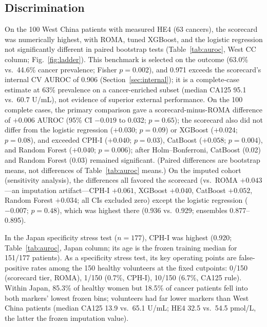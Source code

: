 \documentclass[conference]{IEEEtran}
\begin{document}
\subsection{Discrimination}\label{sec:discrimination}

On the 100 West China patients with measured HE4 (63 cancers), the
scorecard was numerically highest, with ROMA, tuned XGBoost, and the
logistic regression not significantly different in paired bootstrap
tests
(Table~\ref{tab:auroc}, West CC column; Fig.~\ref{fig:ladder}).
This benchmark is selected on the outcome (63.0\% vs.\ 44.6\%
cancer prevalence; Fisher
$p=0.002$), and 0.971 exceeds the scorecard's internal CV AUROC of
0.906 (Section~\ref{sec:internal}); it is a complete-case estimate
at 63\% prevalence on a cancer-enriched subset
(median CA125 95.1 vs.\ 60.7 U/mL), not evidence of superior
external performance.
On the 100 complete cases, the primary
comparison gave a scorecard-minus-ROMA difference of $+0.006$ AUROC
(95\% CI $-0.019$ to 0.032; $p=0.65$); the scorecard also did not
differ from the logistic regression ($+0.030$; $p=0.09$) or XGBoost
($+0.024$; $p=0.08$), and exceeded CPH-I ($+0.040$; $p=0.03$),
CatBoost ($+0.058$; $p=0.004$), and Random Forest ($+0.040$;
$p=0.006$); after Holm--Bonferroni, CatBoost (0.02) and
Random Forest (0.03) remained significant. (Paired differences are
bootstrap means, not differences of Table~\ref{tab:auroc} means.)
On the imputed cohort
(sensitivity analysis), the differences
all favored the scorecard (vs.\ ROMA $+0.043$---an
imputation artifact---CPH-I
$+0.061$, XGBoost $+0.040$, CatBoost $+0.052$, Random Forest
$+0.034$; all CIs excluded zero) except the logistic regression
($-0.007$; $p=0.48$), which was highest there (0.936 vs.\ 0.929;
ensembles 0.877--0.895).

In the Japan specificity stress test ($n=177$), CPH-I was highest
(0.920; Table~\ref{tab:auroc}, Japan column; its age is the frozen
training median for 151/177 patients). As a specificity stress test, its key operating points are
false-positive rates among the 150 healthy volunteers at the fixed
cutpoints: 0/150 (scorecard tier, ROMA), 1/150 (0.7\%, CPH-I),
10/150 (6.7\%, CA125 rule).
Within Japan, 85.3\% of healthy women but 18.5\% of cancer
patients fell into both markers' lowest frozen bins; volunteers
had far lower markers than West China patients (median
CA125 13.9 vs.\ 65.1 U/mL; HE4 32.5 vs.\ 54.5 pmol/L, the
latter the frozen imputation value).
\end{document}
